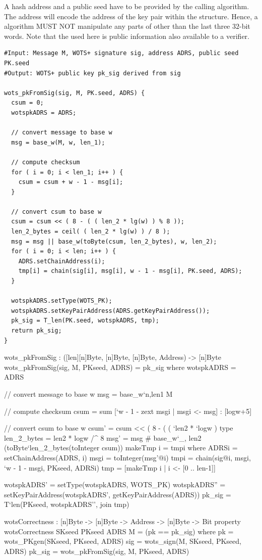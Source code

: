 A \wotsp hash address \adrs and a public seed \pseed have to be provided by the 
calling algorithm. The address will encode the address of the \wotsp key
pair within the \spx structure. Hence, a \wotsp algorithm MUST NOT
manipulate any parts of \adrs other than the last three $32$-bit words.
Note that the \pseed used here is public information also available to 
a verifier.

\begin{lstlisting}[label=alg:wots_pkfromsig, language=pseudoc,
                   caption=\texttt{wots\_pkFromSig} -- Computing a WOTS+ public key from a
                           message and its signature.]
#Input: Message M, WOTS+ signature sig, address ADRS, public seed PK.seed
#Output: WOTS+ public key pk_sig derived from sig 

wots_pkFromSig(sig, M, PK.seed, ADRS) {
  csum = 0;
  wotspkADRS = ADRS;

  // convert message to base w
  msg = base_w(M, w, len_1);

  // compute checksum
  for ( i = 0; i < len_1; i++ ) {
    csum = csum + w - 1 - msg[i];
  }

  // convert csum to base w
  csum = csum << ( 8 - ( ( len_2 * lg(w) ) % 8 ));
  len_2_bytes = ceil( ( len_2 * lg(w) ) / 8 );
  msg = msg || base_w(toByte(csum, len_2_bytes), w, len_2);
  for ( i = 0; i < len; i++ ) {
    ADRS.setChainAddress(i);
    tmp[i] = chain(sig[i], msg[i], w - 1 - msg[i], PK.seed, ADRS);
  }

  wotspkADRS.setType(WOTS_PK);
  wotspkADRS.setKeyPairAddress(ADRS.getKeyPairAddress());
  pk_sig = T_len(PK.seed, wotspkADRS, tmp);
  return pk_sig;
}
\end{lstlisting}

\begin{code}
  wots_pkFromSig : ([len][n]Byte, [n]Byte, [n]Byte, Address) -> [n]Byte
  wots_pkFromSig(sig, M, PKseed, ADRS) = pk_sig where
    wotspkADRS = ADRS

    // convert message to base w
    msg = base_w`{n,len1} M

    // compute checksum
    csum = sum [`w - 1 - zext msgi | msgi <- msg] : [logw+5]

    // convert csum to base w
    csum' = csum << ( 8 - ( ( `len2 * `logw ) %
    type len_2_bytes = len2 * logw /^ 8
    msg' = msg # base_w`{_, len2} (toByte`{len_2_bytes}(toInteger csum))
    makeTmp i = tmpi where
      ADRSi = setChainAddress(ADRS, i)
      msgi = toInteger(msg'@i)
      tmpi = chain(sig@i, msgi, `w - 1 - msgi, PKseed, ADRSi)
    tmp = [makeTmp i | i <- [0 .. len-1]]
    
    wotspkADRS' = setType(wotspkADRS, WOTS_PK)
    wotspkADRS'' = setKeyPairAddress(wotspkADRS', getKeyPairAddress(ADRS))
    pk_sig = T`{len}(PKseed, wotspkADRS'', join tmp)

  wotsCorrectness : [n]Byte -> [n]Byte -> Address -> [n]Byte -> Bit
  property wotsCorrectness SKseed PKseed ADRS M = (pk == pk_sig) where
    pk = wots_PKgen(SKseed, PKseed, ADRS)
    sig = wots_sign(M, SKseed, PKseed, ADRS)
    pk_sig = wots_pkFromSig(sig, M, PKseed, ADRS)
\end{code}

